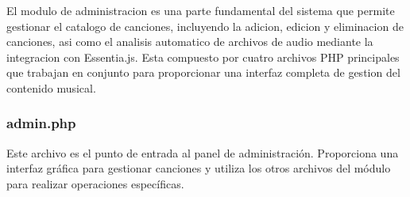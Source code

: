 \documentclass[a4paper,12pt]{article}
\begin{document}
El modulo de administracion es una parte fundamental del sistema que permite gestionar el catalogo de canciones, incluyendo la adicion, edicion y eliminacion de canciones, asi como el analisis automatico de archivos de audio mediante la integracion con Essentia.js. Esta compuesto por cuatro archivos PHP principales que trabajan en conjunto para proporcionar una interfaz completa de gestion del contenido musical.

\subsubsection{admin.php}

Este archivo es el punto de entrada al panel de administración. Proporciona una interfaz gráfica para gestionar canciones y utiliza los otros archivos del módulo para realizar operaciones específicas.
\end{document}
